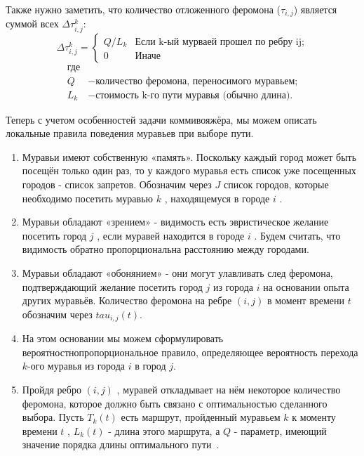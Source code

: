 \documentclass[a4paper,oneside,14pt]{extreport}
\begin{document}
\begin{enumerate}
	Также нужно заметить, что количество отложенного феромона ($\tau _{i,j}$) является суммой всех $\Delta \tau _{i,j}^k$:\\
	
	\begin{equation}\label{form:add} 
	{\displaystyle \Delta \tau _{i,j}^k={\begin{cases}Q/L_{k}& {\mbox{Если k-ый мурваей прошел по ребру ij;}}\\0&{\mbox{Иначе}}\end{cases}}}
	\end{equation}
	\begin{align*}
	\text{где} \\
	Q &- \text{количество феромона, переносимого муравьем;} \\
	L_{k} &- \text{стоимость k-го пути муравья (обычно длина).}
	\end{align*}  
	
\end{enumerate}

Теперь с учетом особенностей задачи коммивояжёра, мы можем описать локальные правила поведения муравьев при выборе пути.
\begin{enumerate}
	\item  Муравьи имеют собственную «память». Поскольку каждый город может быть посещён только один раз, то у каждого муравья есть список уже посещенных городов - список запретов. Обозначим через $J$ список городов, которые необходимо посетить муравью $k$ , находящемуся в городе $i$ .
	
	\item Муравьи обладают «зрением» - видимость есть эвристическое желание посетить город $j$ , если муравей находится в городе $i$ . Будем считать, что видимость обратно пропорциональна расстоянию между городами.
	
	\item Муравьи обладают «обонянием» - они могут улавливать след феромона, подтверждающий желание посетить город $j$ из города $i$ на основании опыта других муравьёв. Количество феромона на ребре $(i,j)$ в момент времени $t$ обозначим через  $tau _{i,j} (t)$.
	
	\item На этом основании мы можем сформулировать вероятностнопропорциональное правило, определяющее вероятность перехода $k$-ого муравья из города $i$  в город $j$.
	
	\item  Пройдя ребро $(i,j)$ , муравей откладывает на нём некоторое количество феромона, которое должно быть связано с оптимальностью сделанного выбора. Пусть $T _{k} (t)$ есть маршрут, пройденный муравьем $k$ к моменту времени $t$ , $L _{k} (t)$ - длина этого маршрута, а $Q$ - параметр, имеющий значение порядка длины оптимального пути~\cite{3}.
\end{enumerate} 
\end{document}
